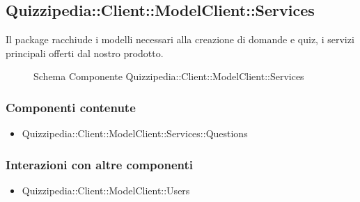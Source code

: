\subsection{Quizzipedia::Client::ModelClient::Services}
Il package racchiude i modelli necessari alla creazione di domande e quiz, i servizi principali offerti dal nostro prodotto.
\begin{figure}[H]
\centering
\noindent{}
\caption[Schema Componente Quizzipedia::Client::ModelClient::Services]{Schema Componente Quizzipedia::Client::ModelClient::Services}
\end{figure}
\subsubsection{Componenti contenute}
\begin{itemize}
\item Quizzipedia::Client::ModelClient::Services::Questions
\end{itemize}
\subsubsection{Interazioni con altre componenti}
\begin{itemize}
\item Quizzipedia::Client::ModelClient::Users
\end{itemize}
